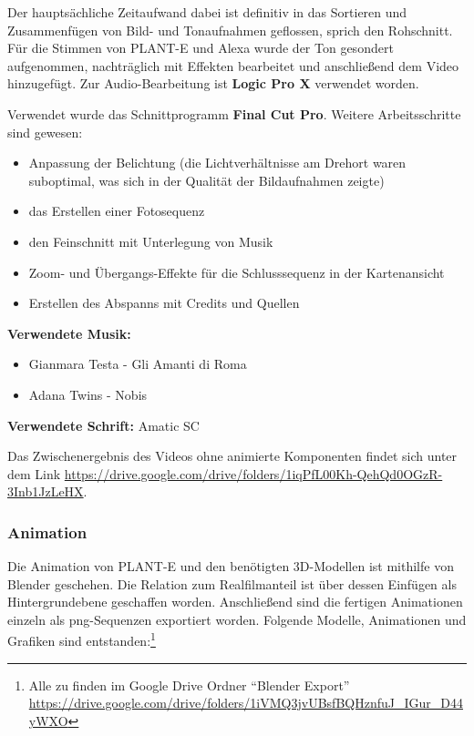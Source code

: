 Der hauptsächliche Zeitaufwand dabei ist definitiv in das Sortieren und
Zusammenfügen von Bild- und Tonaufnahmen geflossen, sprich den
Rohschnitt. Für die Stimmen von PLANT-E und Alexa wurde der Ton
gesondert aufgenommen, nachträglich mit Effekten bearbeitet und
anschließend dem Video hinzugefügt. Zur Audio-Bearbeitung ist
\textbf{Logic Pro X }verwendet worden.

Verwendet wurde das Schnittprogramm \textbf{Final Cut Pro}. Weitere
Arbeitsschritte sind gewesen:

\begin{itemize}
\tightlist
\item
  Anpassung der Belichtung (die Lichtverhältnisse am Drehort waren
  suboptimal, was sich in der Qualität der Bildaufnahmen zeigte)
\item
  das Erstellen einer Fotosequenz
\item
  den Feinschnitt mit Unterlegung von Musik
\item
  Zoom- und Übergangs-Effekte für die Schlusssequenz in der
  Kartenansicht
\item
  Erstellen des Abspanns mit Credits und Quellen
\end{itemize}

\textbf{Verwendete Musik:}

\begin{itemize}
\tightlist
\item
  Gianmara Testa - Gli Amanti di Roma
\item
  Adana Twins - Nobis
\end{itemize}

\textbf{Verwendete Schrift:} Amatic SC

Das Zwischenergebnis des Videos ohne animierte Komponenten findet sich
unter dem Link
\url{https://drive.google.com/drive/folders/1iqPfL00Kh-QehQd0OGzR-3Inb1JzLeHX}.

\hypertarget{animation}{%
\subsubsection{Animation}\label{animation}}

Die Animation von PLANT-E und den benötigten 3D-Modellen ist mithilfe
von Blender geschehen. Die Relation zum Realfilmanteil ist über dessen
Einfügen als Hintergrundebene geschaffen worden. Anschließend sind die
fertigen Animationen einzeln als png-Sequenzen exportiert worden.
Folgende Modelle, Animationen und Grafiken sind entstanden:\footnote{Alle
  zu finden im Google Drive Ordner ``Blender Export''
  \url{https://drive.google.com/drive/folders/1iVMQ3jvUBsfBQHznfuJ_IGur_D44yWXO}}

